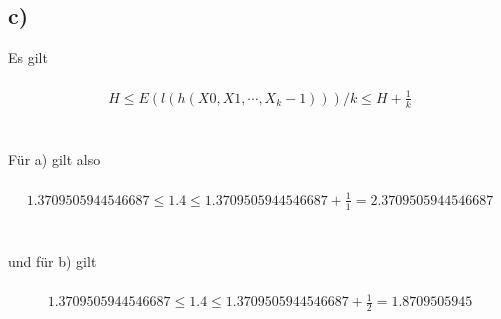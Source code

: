   \subsection*{c)}

  Es gilt\\
  \\
  \begin{align*}
    H \leq E(l(h(X0, X1, \cdots, X_k−1))) / k \leq H + \frac{1}{k}
  \end{align*}\\
  \\
  Für a) gilt also\\
  \\
  \begin{align*}
    1.3709505944546687 \leq 1.4 \leq 1.3709505944546687 + \frac{1}{1} = 2.3709505944546687
  \end{align*}\\
  \\
  und für b) gilt\\
  \\
  \begin{align*}
    1.3709505944546687 \leq 1.4 \leq 1.3709505944546687 + \frac{1}{2} = 1.8709505945
  \end{align*}



